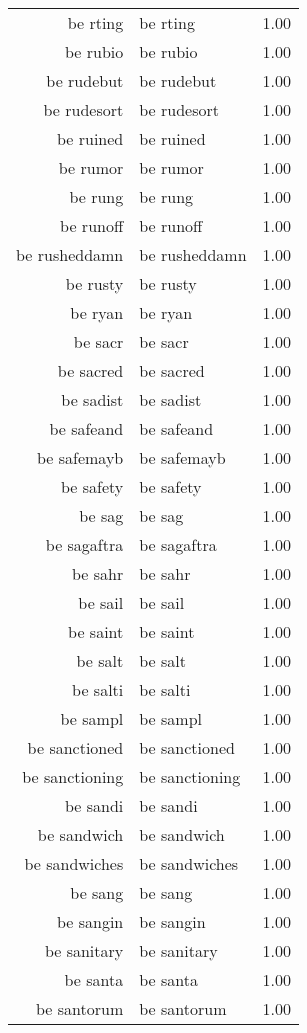 \begin{table}[ht]
\begin{tabular}{rlr}
  be rting & be rting & 1.00 \\ 
  be rubio & be rubio & 1.00 \\ 
  be rudebut & be rudebut & 1.00 \\ 
  be rudesort & be rudesort & 1.00 \\ 
  be ruined & be ruined & 1.00 \\ 
  be rumor & be rumor & 1.00 \\ 
  be rung & be rung & 1.00 \\ 
  be runoff & be runoff & 1.00 \\ 
  be rusheddamn & be rusheddamn & 1.00 \\ 
  be rusty & be rusty & 1.00 \\ 
  be ryan & be ryan & 1.00 \\ 
  be sacr & be sacr & 1.00 \\ 
  be sacred & be sacred & 1.00 \\ 
  be sadist & be sadist & 1.00 \\ 
  be safeand & be safeand & 1.00 \\ 
  be safemayb & be safemayb & 1.00 \\ 
  be safety & be safety & 1.00 \\ 
  be sag & be sag & 1.00 \\ 
  be sagaftra & be sagaftra & 1.00 \\ 
  be sahr & be sahr & 1.00 \\ 
  be sail & be sail & 1.00 \\ 
  be saint & be saint & 1.00 \\ 
  be salt & be salt & 1.00 \\ 
  be salti & be salti & 1.00 \\ 
  be sampl & be sampl & 1.00 \\ 
  be sanctioned & be sanctioned & 1.00 \\ 
  be sanctioning & be sanctioning & 1.00 \\ 
  be sandi & be sandi & 1.00 \\ 
  be sandwich & be sandwich & 1.00 \\ 
  be sandwiches & be sandwiches & 1.00 \\ 
  be sang & be sang & 1.00 \\ 
  be sangin & be sangin & 1.00 \\ 
  be sanitary & be sanitary & 1.00 \\ 
  be santa & be santa & 1.00 \\ 
  be santorum & be santorum & 1.00 \\ 

\end{tabular}
\end{table}
